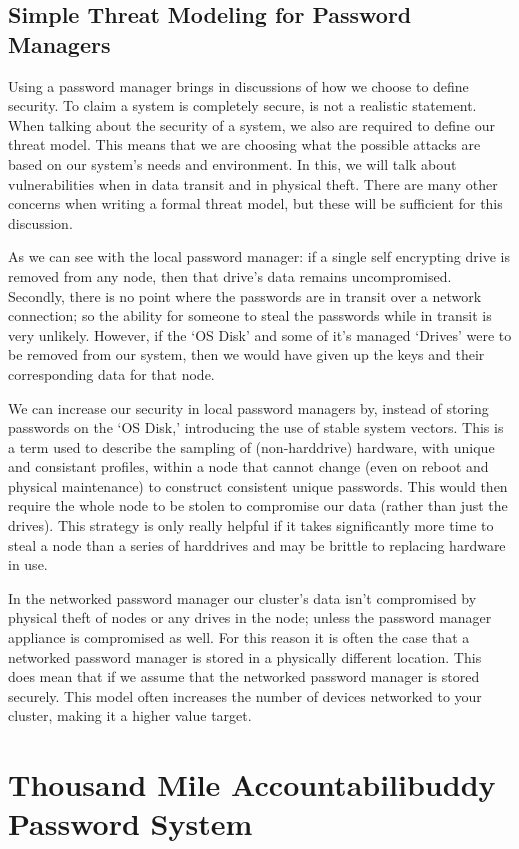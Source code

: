 \documentclass[11pt]{article} %
\def\aps{Accountabilibuddy Password System\xspace}
\def\ssv{stable system vectors\xspace}
\def\pm{password manager\xspace}
\def\lpm{local \pm}
\def\npm{networked \pm}
\def\tm{threat model\xspace}
\def\sed{self encrypting drive\xspace}
\begin{document}
\subsection*{Simple Threat Modeling for Password Managers}
Using a \pm brings in discussions of how we choose to define security. To claim a system is completely secure, is not a realistic statement. When talking about the security of a system, we also are required to define our \tm. This means that we are choosing what the possible attacks are based on our system's needs and environment. In this, we will talk about vulnerabilities when in data transit and in physical theft. There are many other concerns when writing a formal threat model, but these will be sufficient for this discussion.

As we can see with the \lpm: if a single \sed is removed from any node, then that drive's data remains uncompromised. Secondly, there is no point where the passwords are in transit over a network connection; so the ability for someone to steal the passwords while in transit is very unlikely. However, if the `OS Disk' and some of it's managed `Drives' were to be removed from our system, then we would have given up the keys and their corresponding data for that node.

We can increase our security in \lpm{s} by, instead of storing passwords on the `OS Disk,' introducing the use of \ssv. This is a term used to describe the sampling of (non-harddrive) hardware, with unique and consistant profiles, within a node that cannot change (even on reboot and physical maintenance) to construct consistent unique passwords. This would then require the whole node to be stolen to compromise our data (rather than just the drives). This strategy is only really helpful if it takes significantly more time to steal a node than a series of harddrives and may be brittle to replacing hardware in use.

In the \npm our cluster's data isn't compromised by physical theft of nodes or any drives in the node; unless the \pm appliance is compromised as well. For this reason it is often the case that a \npm is stored in a physically different location. This does mean that if we assume that the \npm is stored securely. This model often increases the number of devices networked to your cluster, making it a higher value target.

\section*{Thousand Mile \aps}
\end{document}
